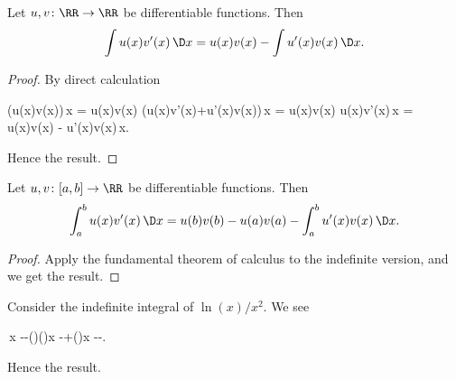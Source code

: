 \begin{node}\label{calculus:integral-000C}%
\begin{node}\label{calculus:integral-000D}%
Let $u,v\colon\RR\to\RR$ be differentiable functions. Then
\[\int u(x)v'(x)\,\D x=u(x)v(x)-\int u'(x)v(x)\,\D x.\]
\begin{proof}
By direct calculation
\begin{calculation}
\int{}(u(x)v(x))\,\D x = u(x)v(x)
\int(u(x)v'(x)+u'(x)v(x))\,\D x = u(x)v(x)
\int u(x)v'(x)\,\D x = u(x)v(x) - \int u'(x)v(x)\,\D x.
\end{calculation}
Hence the result.
\end{proof}
\end{node}

\begin{node}\label{calculus:integral-000E}%
Let $u,v\colon[a,b]\to\RR$ be differentiable functions. Then
\[\int^{b}_{a} u(x)v'(x)\,\D x=u(b)v(b)-u(a)v(a)-\int^{b}_{a} u'(x)v(x)\,\D x.\]
\begin{proof}
Apply the fundamental theorem of calculus to the indefinite version, and
we get the result.
\end{proof}
\end{node}

\begin{example}\label{calculus:integral-000F}%
Consider the indefinite integral of $\ln(x)/x^{2}$. We see
\begin{calculation}
\int{}\,\D x
--\int\left(\right)\left(\right)\D x
-+\int\left(\right)\D x
--.
\end{calculation}
Hence the result.
\end{example}

\end{node} %